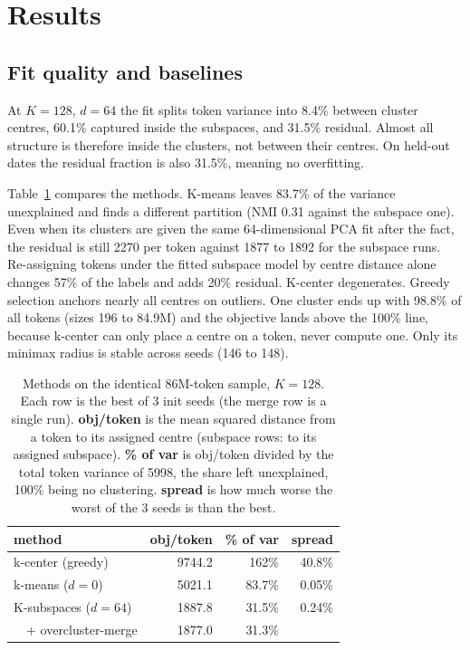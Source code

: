 \documentclass[10pt,twocolumn]{article}
\newcommand{\kmobj}{5021.1}              %
\newcommand{\kmspread}{0.05\%}           %
\newcommand{\kmresid}{83.7\%}            %
\newcommand{\kmnmi}{0.31}                %
\newcommand{\kmpca}{2270}                %
\newcommand{\kcobj}{9744.2}              %
\newcommand{\kcresid}{162\%}             %
\newcommand{\kcspread}{40.8\%}           %
\newcommand{\kcminmax}{196 to 84.9M}     %
\begin{document}
\section{Results}

\subsection{Fit quality and baselines}
At $K{=}128$, $d{=}64$ the fit splits token variance into 8.4\% between
cluster centres, 60.1\% captured inside the subspaces, and 31.5\% residual.
Almost all structure is therefore inside the clusters, not between their
centres. On held-out dates the residual fraction is also 31.5\%, meaning no
overfitting.

Table~\ref{tab:methods} compares the methods. K-means leaves \kmresid{} of
the variance unexplained and finds a different
partition (NMI \kmnmi{} against the subspace one). Even when its clusters are
given the same 64-dimensional PCA fit after the fact, the residual is still
\kmpca{} per token against 1877 to 1892 for the subspace runs. Re-assigning
tokens under the fitted subspace model by centre distance alone changes 57\%
of the labels and adds 20\% residual. K-center degenerates. Greedy selection
anchors nearly all centres on outliers. One cluster ends up with 98.8\% of
all tokens (sizes \kcminmax) and the objective lands above the 100\% line,
because k-center can only place a centre on a token, never compute one.
Only its minimax radius is stable across seeds (146 to 148).

\begin{table}[t]
\centering\small
\caption{Methods on the identical 86M-token sample, $K{=}128$. Each row is
the best of 3 init seeds (the merge row is a single run). \textbf{obj/token}
is the mean squared distance from a token to its assigned centre (subspace
rows: to its assigned subspace). \textbf{\% of var} is obj/token divided by
the total token variance of 5998, the share left unexplained, 100\% being
no clustering. \textbf{spread} is how much worse the worst of the 3 seeds
is than the best.}
\label{tab:methods}
\begin{tabular}{lrrr}
\hline
method & obj/token & \% of var & spread \\
\hline
k-center (greedy) & \kcobj & \kcresid & \kcspread \\
k-means ($d{=}0$) & \kmobj & \kmresid & \kmspread \\
K-subspaces ($d{=}64$) & 1887.8 & 31.5\% & 0.24\% \\
~~+ overcluster-merge & 1877.0 & 31.3\% & \\
\hline
\end{tabular}
\end{table}
\end{document}
